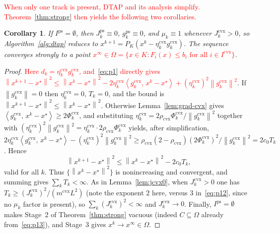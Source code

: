 \documentclass[]{interact}
\theoremstyle{plain}
\newtheorem{corollary}[theorem]{Corollary}
\theoremstyle{definition}
\theoremstyle{remark}
\newcommand{\norm}[1]{\left\lVert #1 \right\rVert}
\newcommand{\inner}[2]{\left\langle #1,\, #2 \right\rangle}
\newcommand{\cvx}{\mathrm{cvx}}
\newcommand{\ps}{\mathrm{ps}}
\newcommand{\dtap}{\textsc{DTAP}}
\begin{document}
\leavevmode\textcolor{red}{When only one track is present, \dtap{} and its analysis simplify. Theorem~\ref{thm:strong} then yields the following two corollaries.}

\begin{corollary}\label{cor:cvx}
If $I^{\ps}=\emptyset$, then $J^{\ps}_k\equiv0$, $g^{\ps}_k\equiv0$, and $\mu_k\equiv1$ whenever $J^{\cvx}_k>0$, so Algorithm~\ref{alg:dtap} reduces to $x^{k+1}=P_K(x^k-\eta^{\cvx}_k g^{\cvx}_k)$. The sequence converges strongly to a point \leavevmode\textcolor{red}{$x^\infty\in\Omega=\{x\in K:F_i(x)\le b_i\text{ for all }i\in I^{\cvx}\}$}.
\end{corollary}
\begin{proof}
\leavevmode\textcolor{red}{Here $d_k=\eta^{\cvx}_k g^{\cvx}_k$, and~\eqref{eq:p1} directly gives $\norm{x^{k+1}-x^\star}^2\le\norm{x^k-x^\star}^2-2\eta^{\cvx}_k\inner{g^{\cvx}_k}{x^k-x^\star}+(\eta^{\cvx}_k)^2\norm{g^{\cvx}_k}^2$}. If $\norm{g^{\cvx}_k}=0$ then $\eta^{\cvx}_k=0$, $T_k=0$, and the bound is $\norm{x^{k+1}-x^\star}^2\le\norm{x^k-x^\star}^2$. Otherwise Lemma~\ref{lem:grad-cvx} gives $\inner{g^{\cvx}_k}{x^k-x^\star}\ge2\Phi^{\cvx}_k$, and substituting $\eta^{\cvx}_k=2\rho_{\cvx}\Phi^{\cvx}_k/\norm{g^{\cvx}_k}^2$ together with $(\eta^{\cvx}_k)^2\norm{g^{\cvx}_k}^2=\eta^{\cvx}_k\cdot2\rho_{\cvx}\Phi^{\cvx}_k$ yields, after simplification, $2\eta^{\cvx}_k\inner{g^{\cvx}_k}{x^k-x^\star}-(\eta^{\cvx}_k)^2\norm{g^{\cvx}_k}^2\ge\rho_{\cvx}(2-\rho_{\cvx})(2\Phi^{\cvx}_k)^2/\norm{g^{\cvx}_k}^2=2c_0T_k$. Hence
\begin{equation}\label{eq:p15}
\norm{x^{k+1}-x^\star}^2\le\norm{x^k-x^\star}^2-2c_0T_k ,
\end{equation}
valid for all $k$. Thus $\{\norm{x^k-x^\star}^2\}$ is nonincreasing and convergent, and summing gives $\sum_k T_k<\infty$. As in Lemma~\ref{lem:jcvx0}, when $J^{\cvx}_k>0$ one has $T_k\ge(J^{\cvx}_k)^2/(m^{\cvx}L^2)$ (note the exponent $2$ here, versus $3$ in~\eqref{eq:p12}, since no $\mu_k$ factor is present), so $\sum_k(J^{\cvx}_k)^2<\infty$ and $J^{\cvx}_k\to0$. Finally, $I^{\ps}=\emptyset$ makes Stage~2 of Theorem~\ref{thm:strong} vacuous (indeed $C\subseteq\Omega$ already from~\eqref{eq:p13}), and Stage~3 gives $x^k\to x^\infty\in\Omega$.
\end{proof}
\end{document}
